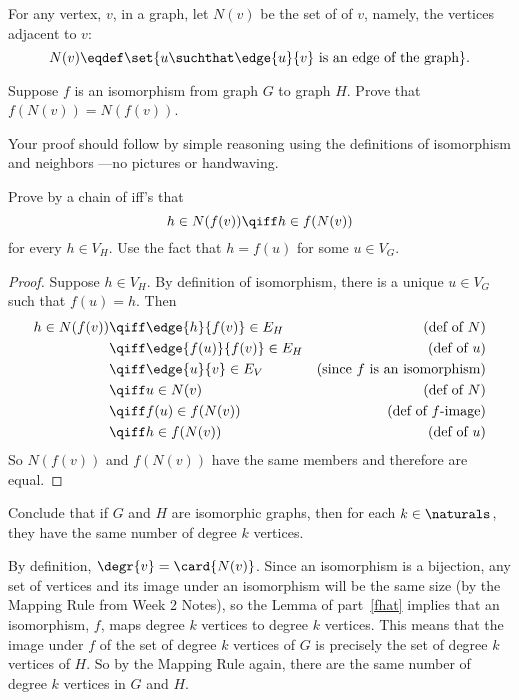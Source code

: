 \begin{problem}
\bparts

\ppart\label{fhat} For any vertex, $v$, in a graph, let $N(v)$ be
the set of  of $v$, namely, the vertices adjacent to $v$:
\[
N(v) \eqdef \set{u \suchthat \edge{u}{v}\text{ is an edge of the
graph}}.
\]

Suppose $f$ is an isomorphism from graph $G$ to graph $H$.
Prove that $f(N(v)) = N(f(v))$.

Your proof should follow by simple reasoning using the definitions of
isomorphism and neighbors ---no pictures or handwaving.

\hint Prove by a chain of iff's that
\[
h \in N(f(v)) \qiff h \in f(N(v))
\]
for every $h \in V_H$.  Use the fact that $h=f(u)$ for some $u \in V_G$.

\begin{solution}
\begin{proof}
Suppose $h \in V_H$.  By definition of isomorphism, there is a
  unique $u \in V_G$ such that $f(u)=h$.  Then
\begin{align*}
h \in N(f(v))
    & \qiff \edge{h}{f(v)} \in E_H          & \text{(def of $N$)}\\
    & \qiff \edge{f(u)}{f(v)} \in E_H       & \text{(def of $u$)}\\
    & \qiff \edge{u}{v} \in E_V             & \text{(since $f$ is an isomorphism)}\\
    & \qiff u \in N(v)                      & \text{(def of $N$)}\\
    & \qiff f(u) \in f(N(v))                & \text{(def of $f$-image)}\\
    & \qiff h \in f(N(v))                   & \text{(def of $u$)}
\end{align*}
So $N(f(v))$ and $f(N(v))$ have the same members and therefore are equal.

\end{proof}
\end{solution}

\ppart Conclude that if $G$ and $H$ are isomorphic graphs, then for each
$k \in \naturals$, they have the same number of degree $k$ vertices.

\begin{solution}
By definition, $\degr{v}= \card{N(v)}$.  Since an isomorphism is
  a bijection, any set of vertices and its image under an isomorphism will
  be the same size (by the Mapping Rule from Week 2 Notes), so the Lemma
  of part~\eqref{fhat} implies that an isomorphism, $f$, maps degree $k$
  vertices to degree $k$ vertices.  This means that the image under $f$ of
  the set of degree $k$ vertices of $G$ is precisely the set of degree $k$
  vertices of $H$.  So by the Mapping Rule again, there are the same
  number of degree $k$ vertices in $G$ and $H$.
\end{solution}

\eparts

\end{problem}
